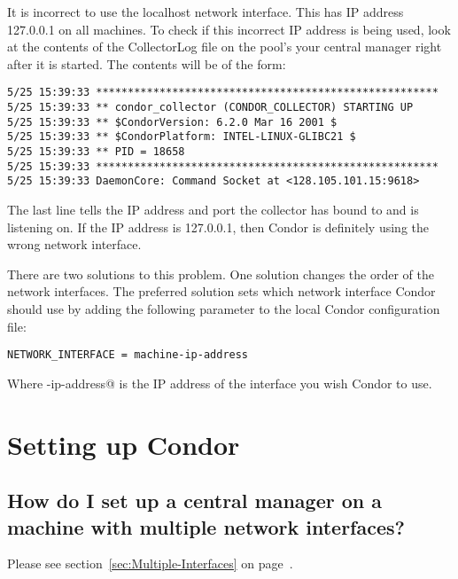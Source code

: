 It is incorrect to use the localhost network interface.
This has IP address 127.0.0.1 on all machines.
To check if this incorrect IP address is being used,
look at the contents of the
CollectorLog file on the pool's
your central manager right after it is started.  
The contents will be of the form:

\footnotesize
\begin{verbatim}
5/25 15:39:33 ******************************************************
5/25 15:39:33 ** condor_collector (CONDOR_COLLECTOR) STARTING UP
5/25 15:39:33 ** $CondorVersion: 6.2.0 Mar 16 2001 $
5/25 15:39:33 ** $CondorPlatform: INTEL-LINUX-GLIBC21 $
5/25 15:39:33 ** PID = 18658
5/25 15:39:33 ******************************************************
5/25 15:39:33 DaemonCore: Command Socket at <128.105.101.15:9618>
\end{verbatim}
\normalsize

The last line tells the IP address and port the collector has
bound to and is listening on.
If the IP address is 127.0.0.1, then Condor is definitely using the wrong
network interface.

There are two solutions to this problem.
One solution changes the order of the network interfaces.
The preferred solution
sets which network interface Condor should use
by adding the following parameter to the
local Condor configuration file:

\begin{verbatim}
NETWORK_INTERFACE = machine-ip-address
\end{verbatim}

Where \verb@machine-ip-address@ is the IP address of the interface you wish
Condor to use.


\section{Setting up Condor}

\subsection*{How do I set up a central manager on a machine with multiple network interfaces?}

Please see section~\ref{sec:Multiple-Interfaces} on 
page~\pageref{sec:Multiple-Interfaces}.

